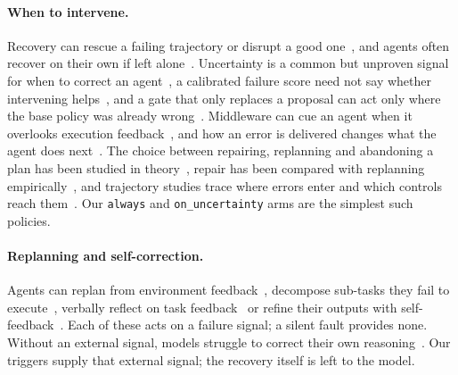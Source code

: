 \paragraph{When to intervene.} Recovery can rescue a failing trajectory or disrupt a good
one~\cite{xiao2026harnesses}, and agents often recover on their own if left alone~\cite{duan2026intervene}.
Uncertainty is a common but unproven signal for when to correct an agent~\cite{li2026uncertainty}, a
calibrated failure score need not say whether intervening helps~\cite{zhang2026calibration}, and a gate
that only replaces a proposal can act only where the base policy was already
wrong~\cite{sethi2026consistency}. Middleware can cue an
agent when it overlooks execution feedback~\cite{yang2026beyond}, and how an error is delivered changes
what the agent does next~\cite{woo2026same}. The choice between repairing, replanning and abandoning a
plan has been studied in theory~\cite{tewari2026ai}, repair has been compared with replanning
empirically~\cite{yuan2026replan}, and trajectory studies trace where errors enter and which controls
reach them~\cite{wang2026dependable}. Our \texttt{always} and \texttt{on\_uncertainty} arms are the
simplest such policies.

\paragraph{Replanning and self-correction.} Agents can replan from environment
feedback~\cite{sun2023adaplanner}, decompose sub-tasks they fail to execute~\cite{prasad2023adapt},
verbally reflect on task feedback~\cite{shinn2023reflexion} or refine their outputs with
self-feedback~\cite{madaan2023selfrefine}. Each of these acts on a failure signal; a silent fault
provides none. Without an external signal, models struggle to correct their own
reasoning~\cite{huang2023large}. Our triggers supply that external signal; the recovery itself is left
to the model.
